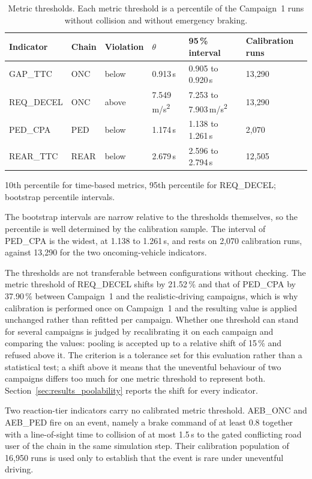 \begin{table}[htbp]
\centering
\caption[Metric thresholds]{Metric thresholds. Each metric threshold is a percentile of the Campaign~1 runs without collision and without emergency braking.}
\label{tab:metric_thresholds}
\small
\begin{tabular}{@{}llllll@{}}
\toprule
{\bfseries Indicator} & {\bfseries Chain} & {\bfseries Violation} & {\bfseries $\theta$} & {\bfseries 95\,\% interval} & {\bfseries Calibration runs} \\
\midrule
GAP\_TTC & ONC & below & 0.913\,s & 0.905 to 0.920\,s & 13,290 \\
REQ\_DECEL & ONC & above & 7.549\,m/s\textsuperscript{2} & 7.253 to 7.903\,m/s\textsuperscript{2} & 13,290 \\
PED\_CPA & PED & below & 1.174\,s & 1.138 to 1.261\,s & 2,070 \\
REAR\_TTC & REAR & below & 2.679\,s & 2.596 to 2.794\,s & 12,505 \\
\bottomrule
\end{tabular}
\par\smallskip\footnotesize\raggedright 10th percentile for time-based metrics, 95th percentile for REQ\_DECEL; bootstrap percentile intervals.
\end{table}

The bootstrap intervals are narrow relative to the thresholds themselves, so the
percentile is well determined by the calibration sample. The interval of
PED\_CPA is the widest, at 1.138 to 1.261\,s, and rests on 2,070 calibration
runs, against 13,290 for the two oncoming-vehicle indicators.

The thresholds are not transferable between configurations without checking. The
metric threshold of REQ\_DECEL shifts by 21.52\,\% and that of PED\_CPA by
37.90\,\% between Campaign~1 and the realistic-driving campaigns, which is why
calibration is performed once on Campaign~1 and the resulting value is applied
unchanged rather than refitted per campaign. Whether one threshold can stand for
several campaigns is judged by recalibrating it on each campaign and comparing the
values: pooling is accepted up to a relative shift of 15\,\% and refused above it.
The criterion is a tolerance set for this evaluation rather than a statistical test;
a shift above it means that the uneventful behaviour of two campaigns differs too
much for one metric threshold to represent both. Section~\ref{sec:results_poolability}
reports the shift for every indicator.

Two reaction-tier indicators carry no calibrated metric threshold. AEB\_ONC and AEB\_PED
fire on an event, namely a brake command of at least 0.8 together with a
line-of-sight time to collision of at most 1.5\,s to the gated conflicting road user of the
chain in the same simulation step. Their calibration population of 16,950 runs is
used only to establish that the event is rare under uneventful driving.
